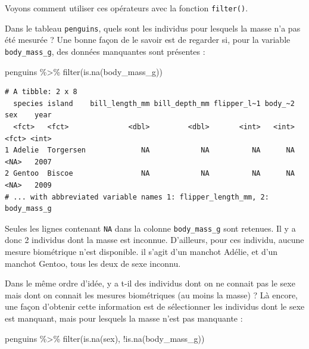 \documentclass[
  letterpaper,
  DIV=11,
  numbers=noendperiod]{scrreprt}
\newenvironment{Shaded}{\begin{snugshade}}{\end{snugshade}}
\newcommand{\FunctionTok}[1]{\textcolor[rgb]{0.28,0.35,0.67}{#1}}
\newcommand{\NormalTok}[1]{\textcolor[rgb]{0.00,0.23,0.31}{#1}}
\newcommand{\SpecialCharTok}[1]{\textcolor[rgb]{0.37,0.37,0.37}{#1}}
\begin{document}
Voyons comment utiliser ces opérateurs avec la fonction
\texttt{filter()}.

Dans le tableau \texttt{penguins}, quels sont les individus pour
lesquels la masse n'a pas été mesurée ? Une bonne façon de le savoir est
de regarder si, pour la variable \texttt{body\_mass\_g}, des données
manquantes sont présentes :

\begin{Shaded}
\begin{Highlighting}[]
\NormalTok{penguins }\SpecialCharTok{\%\textgreater{}\%} 
  \FunctionTok{filter}\NormalTok{(}\FunctionTok{is.na}\NormalTok{(body\_mass\_g))}
\end{Highlighting}
\end{Shaded}

\begin{verbatim}
# A tibble: 2 x 8
  species island    bill_length_mm bill_depth_mm flipper_l~1 body_~2 sex    year
  <fct>   <fct>              <dbl>         <dbl>       <int>   <int> <fct> <int>
1 Adelie  Torgersen             NA            NA          NA      NA <NA>   2007
2 Gentoo  Biscoe                NA            NA          NA      NA <NA>   2009
# ... with abbreviated variable names 1: flipper_length_mm, 2: body_mass_g
\end{verbatim}

Seules les lignes contenant \texttt{NA} dans la colonne
\texttt{body\_mass\_g} sont retenues. Il y a donc 2 individus dont la
masse est inconnue. D'ailleurs, pour ces individu, aucune mesure
biométrique n'est disponible. il s'agit d'un manchot Adélie, et d'un
manchot Gentoo, tous les deux de sexe inconnu.

Dans le même ordre d'idée, y a t-il des individus dont on ne connait pas
le sexe mais dont on connait les mesures biométriques (au moins la
masse) ? Là encore, une façon d'obtenir cette information est de
sélectionner les individus dont le sexe est manquant, mais pour lesquels
la masse n'est pas manquante :

\begin{Shaded}
\begin{Highlighting}[]
\NormalTok{penguins }\SpecialCharTok{\%\textgreater{}\%} 
  \FunctionTok{filter}\NormalTok{(}\FunctionTok{is.na}\NormalTok{(sex),}
         \SpecialCharTok{!}\FunctionTok{is.na}\NormalTok{(body\_mass\_g))}
\end{Highlighting}
\end{Shaded}
\end{document}
